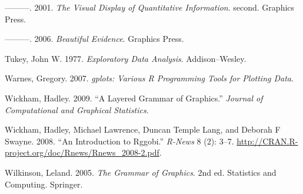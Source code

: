 ---------. 2001. \emph{The Visual Display of Quantitative Information}.
second. Graphics Press.

---------. 2006. \emph{Beautiful Evidence}. Graphics Press.

Tukey, John W. 1977. \emph{Exploratory Data Analysis}. Addison--Wesley.

Warnes, Gregory. 2007. \emph{gplots: Various R Programming Tools for
Plotting Data}.

Wickham, Hadley. 2009. ``A Layered Grammar of Graphics.'' \emph{Journal
of Computational and Graphical Statistics}.

Wickham, Hadley, Michael Lawrence, Duncan {Temple Lang}, and Deborah F
Swayne. 2008. ``An Introduction to Rggobi.'' \emph{R-News} 8 (2): 3--7.
\url{http://CRAN.R-project.org/doc/Rnews/Rnews_2008-2.pdf}.

Wilkinson, Leland. 2005. \emph{The Grammar of Graphics}. 2nd ed.
Statistics and Computing. Springer.
